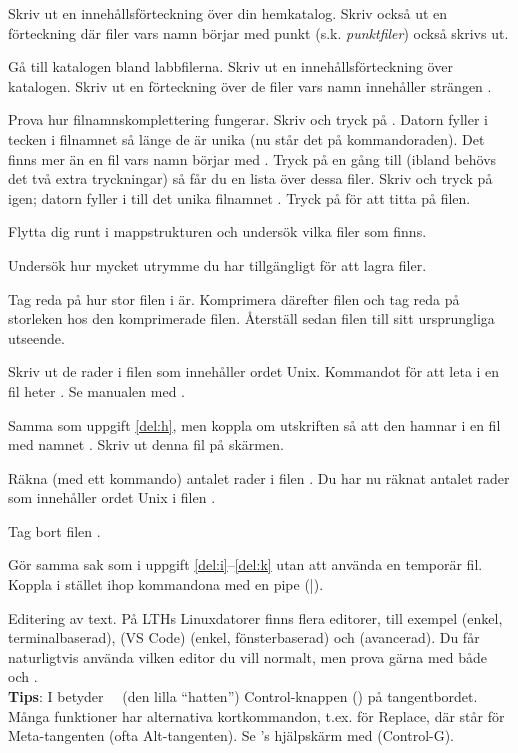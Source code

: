 \begin{Datorarbete}
	\begin{Deluppgifter}
		\item Skriv ut en innehållsförteckning över din hemkatalog. Skriv också ut en förteckning där filer vars namn börjar med punkt (s.k. \emph{punktfiler}) också skrivs ut.
		\item Gå till katalogen  bland labbfilerna. Skriv ut en innehållsförteckning över katalogen. Skriv ut en förteckning över de filer vars namn innehåller strängen .
		\item Prova hur filnamnskomplettering fungerar. Skriv  och tryck på . Datorn fyller i tecken i filnamnet så länge de är unika (nu står det  på kommando\-raden). Det finns mer än en fil vars namn börjar med . Tryck på  en gång till (ibland behövs det två extra tryckningar) så får du en lista över dessa filer. Skriv  och tryck på  igen; datorn fyller i till det unika filnamnet . Tryck på  för att titta på filen.
		\item Flytta dig runt i mappstrukturen och undersök vilka filer som finns.
		\item Undersök hur mycket utrymme du har tillgängligt för att lagra filer.
		\item Tag reda på hur stor filen  i  är. Komprimera därefter filen och tag reda på storleken hos den komprimerade filen. Återställ sedan filen till sitt ursprungliga utseende.
		\item \label{del:h} Skriv ut de rader i filen  som innehåller ordet Unix. Kommandot för att leta i en fil heter . Se manualen med .
		\item \label{del:i} Samma som uppgift \ref{del:h}, men koppla om utskriften så att den hamnar i en fil med namnet . Skriv ut denna fil på skärmen.
		\item Räkna (med ett kommando) antalet rader i filen . Du har nu räknat antalet rader som innehåller ordet Unix i filen .
		\item \label{del:k} Tag bort filen .
		\item Gör samma sak som i uppgift \ref{del:i}--\ref{del:k} utan att använda en temporär fil. Koppla i stället ihop kommandona med en pipe (|).
	\end{Deluppgifter}
	\item Editering av text. På LTHs Linuxdatorer finns flera editorer, till exempel  (enkel, terminalbaserad),  (VS Code) (enkel, fönsterbaserad) och  (avancerad). Du får naturligtvis använda vilken editor du vill normalt, men prova gärna med både  och .\\
	\textbf{Tips}: I  betyder~~\code{\^} (den lilla \enquote{hatten}) Control-knappen () på tangentbordet. Många funktioner har alternativa kortkommandon, t.ex.  för Replace, där  står för Meta-tangenten (ofta Alt-tangenten). Se 's hjälpskärm med  (Control-G).


\end{Datorarbete}
